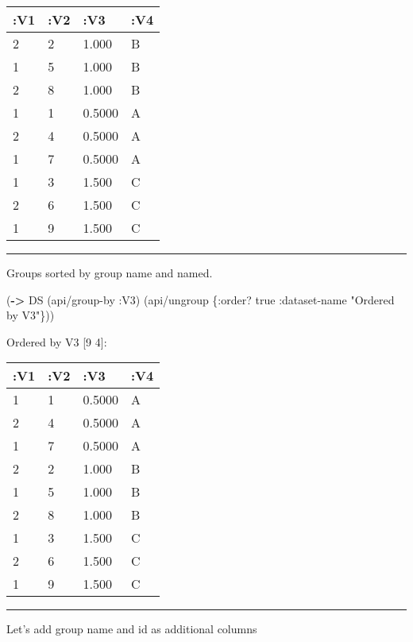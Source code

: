 \documentclass[]{article}
\newenvironment{Shaded}{\begin{snugshade}}{\end{snugshade}}
\newcommand{\KeywordTok}[1]{\textcolor[rgb]{0.13,0.29,0.53}{\textbf{#1}}}
\newcommand{\DecValTok}[1]{\textcolor[rgb]{0.00,0.00,0.81}{#1}}
\newcommand{\StringTok}[1]{\textcolor[rgb]{0.31,0.60,0.02}{#1}}
\newcommand{\VariableTok}[1]{\textcolor[rgb]{0.00,0.00,0.00}{#1}}
\newcommand{\AttributeTok}[1]{\textcolor[rgb]{0.77,0.63,0.00}{#1}}
\newcommand{\NormalTok}[1]{#1}
\begin{document}
\begin{longtable}[]{@{}llll@{}}
\toprule
:V1 & :V2 & :V3 & :V4\tabularnewline
\midrule
\endhead
2 & 2 & 1.000 & B\tabularnewline
1 & 5 & 1.000 & B\tabularnewline
2 & 8 & 1.000 & B\tabularnewline
1 & 1 & 0.5000 & A\tabularnewline
2 & 4 & 0.5000 & A\tabularnewline
1 & 7 & 0.5000 & A\tabularnewline
1 & 3 & 1.500 & C\tabularnewline
2 & 6 & 1.500 & C\tabularnewline
1 & 9 & 1.500 & C\tabularnewline
\bottomrule
\end{longtable}

\begin{center}\rule{0.5\linewidth}{0.5pt}\end{center}

Groups sorted by group name and named.

\begin{Shaded}
\begin{Highlighting}[]
\NormalTok{(}\KeywordTok{->}\NormalTok{ DS}
\NormalTok{    (api/group-by }\AttributeTok{:V3}\NormalTok{)}
\NormalTok{    (api/ungroup \{}\AttributeTok{:order}\NormalTok{? }\VariableTok{true}
                  \AttributeTok{:dataset-name} \StringTok{"Ordered by V3"}\NormalTok{\}))}
\end{Highlighting}
\end{Shaded}

Ordered by V3 {[}9 4{]}:

\begin{longtable}[]{@{}llll@{}}
\toprule
:V1 & :V2 & :V3 & :V4\tabularnewline
\midrule
\endhead
1 & 1 & 0.5000 & A\tabularnewline
2 & 4 & 0.5000 & A\tabularnewline
1 & 7 & 0.5000 & A\tabularnewline
2 & 2 & 1.000 & B\tabularnewline
1 & 5 & 1.000 & B\tabularnewline
2 & 8 & 1.000 & B\tabularnewline
1 & 3 & 1.500 & C\tabularnewline
2 & 6 & 1.500 & C\tabularnewline
1 & 9 & 1.500 & C\tabularnewline
\bottomrule
\end{longtable}

\begin{center}\rule{0.5\linewidth}{0.5pt}\end{center}

Let's add group name and id as additional columns

\begin{Shaded}
\end{Shaded}
\end{document}

